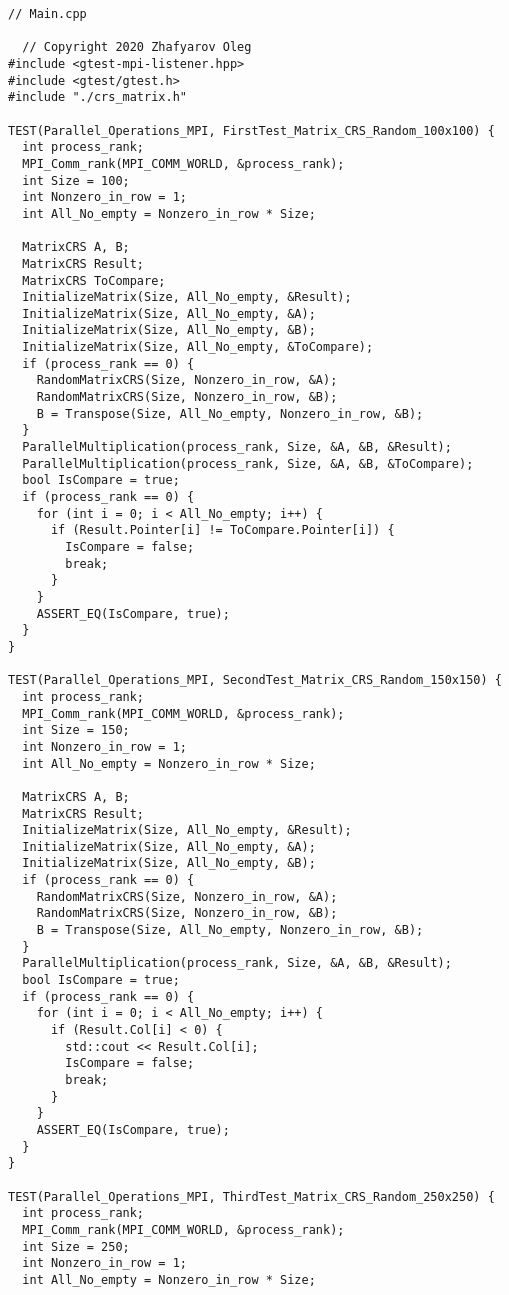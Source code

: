 \documentclass{report}
\begin{document}
\begin{lstlisting}
// Main.cpp

  // Copyright 2020 Zhafyarov Oleg
#include <gtest-mpi-listener.hpp>
#include <gtest/gtest.h>
#include "./crs_matrix.h"

TEST(Parallel_Operations_MPI, FirstTest_Matrix_CRS_Random_100x100) {
  int process_rank;
  MPI_Comm_rank(MPI_COMM_WORLD, &process_rank);
  int Size = 100;
  int Nonzero_in_row = 1;
  int All_No_empty = Nonzero_in_row * Size;

  MatrixCRS A, B;
  MatrixCRS Result;
  MatrixCRS ToCompare;
  InitializeMatrix(Size, All_No_empty, &Result);
  InitializeMatrix(Size, All_No_empty, &A);
  InitializeMatrix(Size, All_No_empty, &B);
  InitializeMatrix(Size, All_No_empty, &ToCompare);
  if (process_rank == 0) {
    RandomMatrixCRS(Size, Nonzero_in_row, &A);
    RandomMatrixCRS(Size, Nonzero_in_row, &B);
    B = Transpose(Size, All_No_empty, Nonzero_in_row, &B);
  }
  ParallelMultiplication(process_rank, Size, &A, &B, &Result);
  ParallelMultiplication(process_rank, Size, &A, &B, &ToCompare);
  bool IsCompare = true;
  if (process_rank == 0) {
    for (int i = 0; i < All_No_empty; i++) {
      if (Result.Pointer[i] != ToCompare.Pointer[i]) {
        IsCompare = false;
        break;
      }
    }
    ASSERT_EQ(IsCompare, true);
  }
}

TEST(Parallel_Operations_MPI, SecondTest_Matrix_CRS_Random_150x150) {
  int process_rank;
  MPI_Comm_rank(MPI_COMM_WORLD, &process_rank);
  int Size = 150;
  int Nonzero_in_row = 1;
  int All_No_empty = Nonzero_in_row * Size;

  MatrixCRS A, B;
  MatrixCRS Result;
  InitializeMatrix(Size, All_No_empty, &Result);
  InitializeMatrix(Size, All_No_empty, &A);
  InitializeMatrix(Size, All_No_empty, &B);
  if (process_rank == 0) {
    RandomMatrixCRS(Size, Nonzero_in_row, &A);
    RandomMatrixCRS(Size, Nonzero_in_row, &B);
    B = Transpose(Size, All_No_empty, Nonzero_in_row, &B);
  }
  ParallelMultiplication(process_rank, Size, &A, &B, &Result);
  bool IsCompare = true;
  if (process_rank == 0) {
    for (int i = 0; i < All_No_empty; i++) {
      if (Result.Col[i] < 0) {
        std::cout << Result.Col[i];
        IsCompare = false;
        break;
      }
    }
    ASSERT_EQ(IsCompare, true);
  }
}

TEST(Parallel_Operations_MPI, ThirdTest_Matrix_CRS_Random_250x250) {
  int process_rank;
  MPI_Comm_rank(MPI_COMM_WORLD, &process_rank);
  int Size = 250;
  int Nonzero_in_row = 1;
  int All_No_empty = Nonzero_in_row * Size;


\end{lstlisting}
\end{document}
